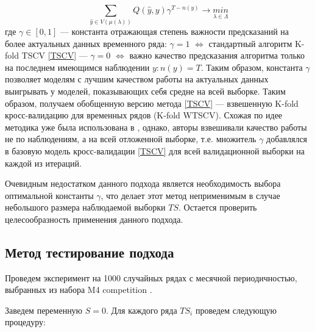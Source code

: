 \documentclass[a4paper, 14pt]{article}
\begin{document}
\begin{equation}\label{WTSCV}
\sum_{\hat y \in V(\mu(\lambda))} Q(\hat y, y) \gamma^{T - n(y)} \rightarrow \underset{\lambda \in \Lambda}{min}
\end{equation}
где $\gamma \in \left[0, 1\right]$ --- константа отражающая степень важности предсказаний на более актуальных данных временного ряда: $\gamma = 1$ $\Leftrightarrow$ стандартный алгоритм K-fold TSCV \eqref{TSCV} --- $\gamma = 0$ $\Leftrightarrow$ важно качество предсказания алгоритма только на последнем имеющимся наблюдении $y: n(y) = T$. Таким образом, константа $\gamma$ позволяет моделям с лучшим качеством работы на актуальных данных выигрывать у моделей, показывающих себя средне на всей выборке. Таким образом, получаем обобщенную версию метода \eqref{TSCV} --- взвешенную K-fold кросс-валидацию для временных рядов (K-fold WTSCV). Схожая по идее методика уже была использована в \cite{donate2013time}, однако, авторы взвешивали качество работы не по наблюдениям, а на всей отложенной выборке, т.е. множитель $\gamma$ добавлялся в базовую модель кросс-валидации \eqref{TSCV} для всей валидационной выборки на каждой из итераций.

Очевидным недостатком данного подхода является необходимость выбора оптимальной константы $\gamma$, что делает этот метод неприменимым в случае небольшого размера наблюдаемой выборки $TS$. Остается проверить целесообразность применения данного подхода. 


\subsection{Метод тестирование подхода}

Проведем эксперимент на 1000 случайных рядах с месячной периодичностью, выбранных из набора M4 competition \cite{m4}.


\noindent Заведем переменную $S = 0$. Для каждого ряда $TS_i$ проведем следующую процедуру:
\end{document}
